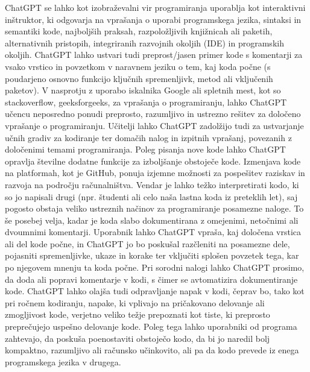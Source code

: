 \documentclass[a4paper,12pt,openright]{book}
\begin{document}
ChatGPT se lahko kot izobraževalni vir programiranja uporablja kot interaktivni inštruktor, ki odgovarja na vprašanja o uporabi programskega jezika, sintaksi in semantiki kode, najboljših praksah, razpoložljivih knjižnicah ali paketih, alternativnih pristopih, integriranih razvojnih okoljih (IDE) in programskih okoljih. ChatGPT lahko ustvari tudi preprost/jasen primer kode s komentarji za vsako vrstico in povzetkom v naravnem jeziku o tem, kaj koda počne (s poudarjeno osnovno funkcijo ključnih spremenljivk, metod ali vključenih paketov). V nasprotju z uporabo iskalnika Google ali spletnih mest, kot so stackoverflow, geeksforgeeks, za vprašanja o programiranju, lahko ChatGPT učencu neposredno ponudi preprosto, razumljivo in ustrezno rešitev za določeno vprašanje o programiranju. Učitelji lahko ChatGPT zadolžijo tudi za ustvarjanje učnih gradiv za kodiranje ter domačih nalog in izpitnih vprašanj, povezanih z določenimi temami programiranja.
Poleg pisanja nove kode lahko ChatGPT opravlja številne dodatne funkcije za izboljšanje obstoječe kode. Izmenjava kode na platformah, kot je GitHub, ponuja izjemne možnosti za pospešitev raziskav in razvoja na področju računalništva. Vendar je lahko težko interpretirati kodo, ki so jo napisali drugi (npr. študenti ali celo naša lastna koda iz preteklih let), saj pogosto obstaja veliko ustreznih načinov za programiranje posamezne naloge. To še posebej velja, kadar je koda slabo dokumentirana z omejenimi, netočnimi ali dvoumnimi komentarji. Uporabnik lahko ChatGPT vpraša, kaj določena vrstica ali del kode počne, in ChatGPT jo bo poskušal razčleniti na posamezne dele, pojasniti spremenljivke, ukaze in korake ter vključiti splošen povzetek tega, kar po njegovem mnenju ta koda počne. Pri sorodni nalogi lahko ChatGPT prosimo, da doda ali popravi komentarje v kodi, s čimer se avtomatizira dokumentiranje kode. ChatGPT lahko olajša tudi odpravljanje napak v kodi, čeprav bo, tako kot pri ročnem kodiranju, napake, ki vplivajo na pričakovano delovanje ali zmogljivost kode, verjetno veliko težje prepoznati kot tiste, ki preprosto preprečujejo uspešno delovanje kode. Poleg tega lahko uporabniki od programa zahtevajo, da poskuša poenostaviti obstoječo kodo, da bi jo naredil bolj kompaktno, razumljivo ali računsko učinkovito, ali pa da kodo prevede iz enega programskega jezika v drugega. \cite{Meyer2023}
\end{document}
